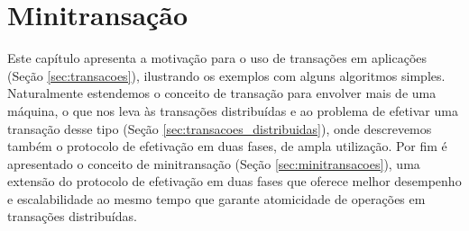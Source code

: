 \documentclass[11pt,twoside,a4paper]{book}
\begin{document}




\chapter{Minitransação}
\label{chap:minitransacao}
Este capítulo apresenta a motivação para o uso de transações em aplicações (Seção \ref{sec:transacoes}), ilustrando os exemplos com alguns algoritmos simples. Naturalmente estendemos o conceito de transação para envolver mais de uma máquina, o que nos leva às transações distribuídas e ao problema de efetivar uma transação desse tipo (Seção \ref{sec:transacoes_distribuidas}), onde descrevemos também o protocolo de efetivação em duas fases, de ampla utilização. Por fim é apresentado o conceito de minitransação (Seção \ref{sec:minitransacoes}), uma extensão do protocolo de efetivação em duas fases que oferece melhor desempenho e escalabilidade ao mesmo tempo que garante atomicidade de operações
em transações distribuídas.

\end{document}
